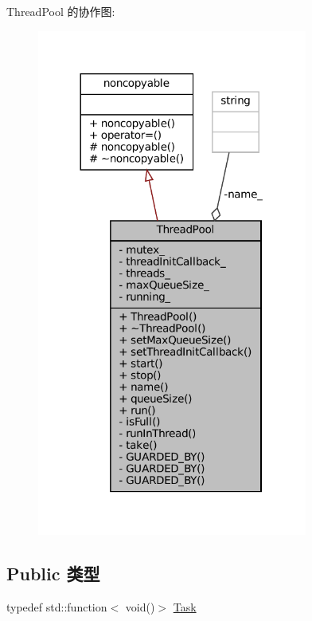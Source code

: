 Thread\+Pool 的协作图\+:
\nopagebreak
\begin{figure}[H]
\begin{center}
\leavevmode
\includegraphics[width=252pt]{classmuduo_1_1ThreadPool__coll__graph}
\end{center}
\end{figure}
\subsection*{Public 类型}
\begin{DoxyCompactItemize}
\item 
typedef std\+::function$<$ void()$>$ \hyperlink{classmuduo_1_1ThreadPool_a46c264006febdf6c5dae5921d59c18d2}{Task}
\end{DoxyCompactItemize}
